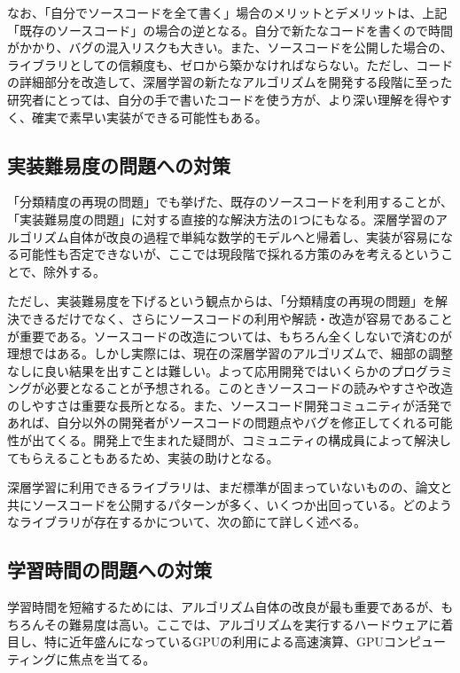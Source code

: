 なお、「自分でソースコードを全て書く」場合のメリットとデメリットは、上記「既存のソースコード」の場合の逆となる。自分で新たなコードを書くので時間がかかり、バグの混入リスクも大きい。また、ソースコードを公開した場合の、ライブラリとしての信頼度も、ゼロから築かなければならない。ただし、コードの詳細部分を改造して、深層学習の新たなアルゴリズムを開発する段階に至った研究者にとっては、自分の手で書いたコードを使う方が、より深い理解を得やすく、確実で素早い実装ができる可能性もある。

\subsection{実装難易度の問題への対策}
「分類精度の再現の問題」でも挙げた、既存のソースコードを利用することが、「実装難易度の問題」に対する直接的な解決方法の1つにもなる。深層学習のアルゴリズム自体が改良の過程で単純な数学的モデルへと帰着し、実装が容易になる可能性も否定できないが、ここでは現段階で採れる方策のみを考えるということで、除外する。\par
ただし、実装難易度を下げるという観点からは、「分類精度の再現の問題」を解決できるだけでなく、さらにソースコードの利用や解読・改造が容易であることが重要である。ソースコードの改造については、もちろん全くしないで済むのが理想ではある。しかし実際には、現在の深層学習のアルゴリズムで、細部の調整なしに良い結果を出すことは難しい。よって応用開発ではいくらかのプログラミングが必要となることが予想される。このときソースコードの読みやすさや改造のしやすさは重要な長所となる。また、ソースコード開発コミュニティが活発であれば、自分以外の開発者がソースコードの問題点やバグを修正してくれる可能性が出てくる。開発上で生まれた疑問が、コミュニティの構成員によって解決してもらえることもあるため、実装の助けとなる。\par%
深層学習に利用できるライブラリは、まだ標準が固まっていないものの、論文と共にソースコードを公開するパターンが多く、いくつか出回っている。どのようなライブラリが存在するかについて、次の節にて詳しく述べる。


\subsection{学習時間の問題への対策}
学習時間を短縮するためには、アルゴリズム自体の改良が最も重要であるが、もちろんその難易度は高い。ここでは、アルゴリズムを実行するハードウェアに着目し、特に近年盛んになっているGPUの利用による高速演算、GPUコンピューティングに焦点を当てる。
